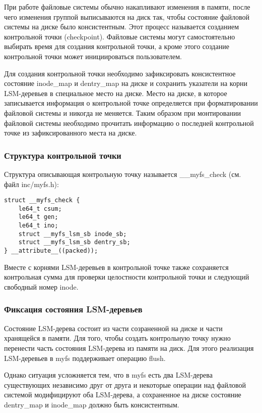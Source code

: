 При работе файловые системы обычно накапливают изменения в памяти, после чего
изменения группой выписываются на диск так, чтобы состояние файловой системы на
диске было консистентным. Этот процесс называется созданием контрольной точки
(checkpoint). Файловые системы могут самостоятельно выбирать время для создания
контрольной точки, а кроме этого создание контрольной точки может инициироваться
пользователем.

Для создания контрольной точки необходимо зафиксировать консистентное состояние
inode\_map и dentry\_map на диске и сохранить указатели на корни LSM-деревьев в
специальное место на диске. Место на диске, в которое записывается информация о
контрольной точке определяется при форматировании файловой системы и никогда не
меняется. Таким образом при монтировании файловой системы необходимо прочитать
информацию о последней контрольной точке из зафиксированного места на диске.


\subsubsection{Структура контрольной точки}

Структура описывающая контрольную точку называется \_\_myfs\_check (см. файл
inc/myfs.h):
\begin{lstlisting}
struct __myfs_check {
    le64_t csum;
    le64_t gen;
    le64_t ino;
    struct __myfs_lsm_sb inode_sb;
    struct __myfs_lsm_sb dentry_sb;
} __attribute__((packed));
\end{lstlisting}

Вместе с корнями LSM-деревьев в контрольной точке также сохраняется контрольная
сумма для проверки целостности контрольной точки и следующий свободный номер
inode.


\subsubsection{Фиксация состояния LSM-деревьев}

Состояние LSM-дерева состоит из части созраненной на диске и части хранящейся в
памяти. Для того, чтобы создать контрольную точку нужно перенести часть
состояния LSM-дерева из памяти на диск. Для этого реализация LSM-деревьев в myfs
поддерживает операцию flush.

Однако ситуация усложняется тем, что в myfs есть два LSM-дерева существующих
независимо друг от друга и некоторые операции над файловой системой модифицируют
оба LSM-дерева, а сохраненное на диске состояние dentry\_map и inode\_map должно
быть консистентным.

